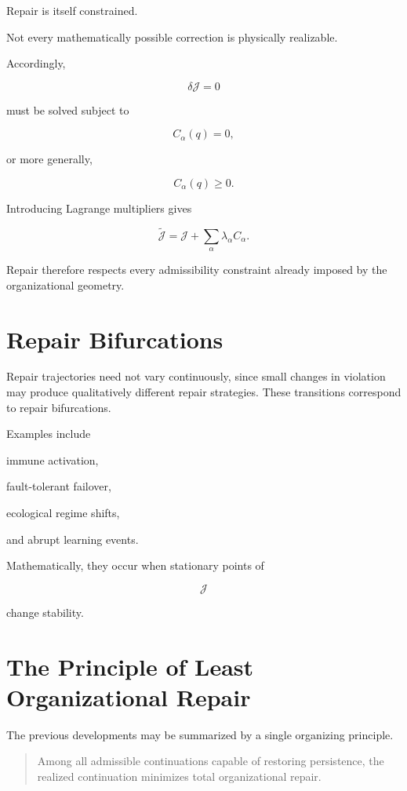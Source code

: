 \documentclass[11pt,oneside]{book}
\numberwithin{equation}{chapter}
\theoremstyle{definition}
\theoremstyle{plain}
\begin{document}
Repair is itself constrained.

Not every mathematically possible correction is physically realizable.

Accordingly,

\[
\delta
\mathcal J
=
0
\]

must be solved subject to

\[
C_\alpha(q)=0,
\]

or more generally,

\[
C_\alpha(q)\ge0.
\]

Introducing Lagrange multipliers gives

\[
\tilde{\mathcal J}
=
\mathcal J
+
\sum_\alpha
\lambda_\alpha
C_\alpha.
\]

Repair therefore respects every admissibility constraint already imposed by
the organizational geometry.

\section{Repair Bifurcations}

Repair trajectories need not vary continuously, since small changes in violation may produce qualitatively different repair strategies. These transitions correspond to repair bifurcations.

Examples include

immune activation,

fault-tolerant failover,

ecological regime shifts,

and abrupt learning events.

Mathematically, they occur when stationary points of

\[
\mathcal J
\]

change stability.

\section{The Principle of Least Organizational Repair}

The previous developments may be summarized by a single organizing
principle.

\begin{quote}

Among all admissible continuations capable of restoring persistence, the
realized continuation minimizes total organizational repair.

\end{quote}
\end{document}
